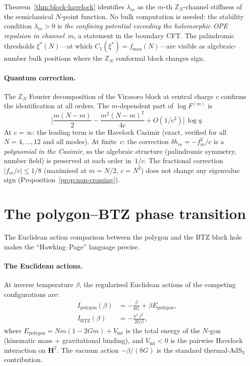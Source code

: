Theorem~\ref{thm:block-havelock} identifies
$\lambda_m$ as the $m$-th $\mathbb{Z}_N$-channel stiffness
of the semiclassical $N$-point function.
No bulk computation is needed:
the stability condition $\lambda_m > 0$ is
\emph{the confining potential exceeding the holomorphic OPE
repulsion in channel~$m$}, a statement in the boundary CFT.
The palindromic thresholds
$\xi^*(N)$---at which $C_1(\xi^*) = f_{\max}(N)$---are
visible as algebraic-number bulk positions where the
$\mathbb{Z}_N$ conformal block changes sign.

\paragraph{Quantum correction.}
The $\mathbb{Z}_N$ Fourier decomposition of the Virasoro block
at central charge $c$ confirms the identification at all orders.
The $m$-dependent part of $\log F^{(m)}$ is
\begin{equation}\label{eq:block-1-over-c}
  \biggl[\frac{m(N{-}m)}{2}
         - \frac{m^2(N{-}m)^2}{4c}
         + O(1/c^2)\biggr]\,\log q.
\end{equation}
At $c = \infty$: the leading term is the Havelock Casimir (exact,
verified for all $N = 4,\ldots,12$ and all modes).
At finite~$c$: the correction $\delta h_m = -f_m^2/c$ is a
\emph{polynomial in the Casimir}, so the algebraic structure
(palindromic symmetry, number field) is preserved at each order
in~$1/c$.  The fractional correction $|f_m/c| \le 1/8$
(maximised at $m = N/2$, $c = N^2$) does not change any eigenvalue
sign (Proposition~\ref{prop:non-crossing}).


\section{The polygon--BTZ phase transition}

The Euclidean action comparison between the polygon and the
BTZ black hole makes the ``Hawking--Page'' language precise.

\paragraph{The Euclidean actions.}
At inverse temperature $\beta$, the regularised Euclidean
actions of the competing configurations are:
\begin{align}
  I_{\mathrm{polygon}}(\beta)
    &= -\frac{\beta}{8G} + \beta E_{\mathrm{polygon}},
    \label{eq:I-polygon} \\
  I_{\mathrm{BTZ}}(\beta)
    &= -\frac{\pi^2 \ell^2}{2G\beta},
    \label{eq:I-btz}
\end{align}
where $E_{\mathrm{polygon}} = Nm(1{-}2Gm) + V_{\mathrm{int}}$
is the total energy of the $N$-gon (kinematic mass $+$
gravitational binding), and $V_{\mathrm{int}} < 0$ is the
pairwise Havelock interaction on $\mathbf{H}^2$.
The vacuum action $-\beta/(8G)$ is the standard thermal-AdS$_3$
contribution.

